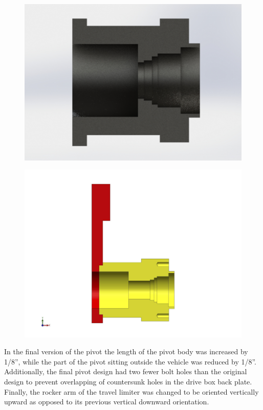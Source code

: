 \begin{figure}[H]
\centering
\begin{minipage}{0.45\linewidth}
\centering
\includegraphics[width=\linewidth]{./images/oldpivothaft}
\label{fig:pivotold}
\end{minipage}
\begin{minipage}{0.45\linewidth}
\centering
\includegraphics[width=\linewidth]{./images/finalpivot}
\label{fig:pivotfinal}
\end{minipage}
\end{figure}

In the final version of the pivot the length of the pivot body was increased by 1/8'', while the part of the pivot sitting outside the vehicle was reduced by 1/8''. Additionally, the final pivot design had two fewer bolt holes than the original design to prevent overlapping of countersunk holes in the drive box back plate. Finally, the rocker arm of the travel limiter was changed to be oriented vertically upward as opposed to its previous vertical downward orientation.

